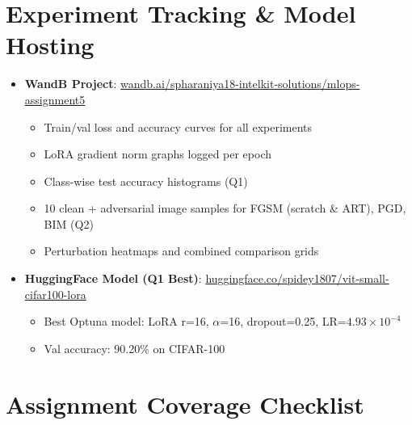 \documentclass[12pt,a4paper]{article}
\begin{document}
\newpage

\section{Experiment Tracking \& Model Hosting}

\begin{tcolorbox}[colback=lightgray, colframe=iitblue, title=\textbf{External Links}]
\begin{itemize}
    \item \textbf{WandB Project}: \href{https://wandb.ai/spharaniya18-intelkit-solutions/mlops-assignment5}{wandb.ai/spharaniya18-intelkit-solutions/mlops-assignment5}
    \begin{itemize}
        \item Train/val loss and accuracy curves for all experiments
        \item LoRA gradient norm graphs logged per epoch
        \item Class-wise test accuracy histograms (Q1)
        \item 10 clean + adversarial image samples for FGSM (scratch \& ART), PGD, BIM (Q2)
        \item Perturbation heatmaps and combined comparison grids
    \end{itemize}
    \item \textbf{HuggingFace Model (Q1 Best)}: \href{https://huggingface.co/spidey1807/vit-small-cifar100-lora}{huggingface.co/spidey1807/vit-small-cifar100-lora}
    \begin{itemize}
        \item Best Optuna model: LoRA r=16, $\alpha$=16, dropout=0.25, LR=$4.93\times10^{-4}$
        \item Val accuracy: 90.20\% on CIFAR-100
    \end{itemize}
\end{itemize}
\end{tcolorbox}

\section{Assignment Coverage Checklist}
\end{document}
